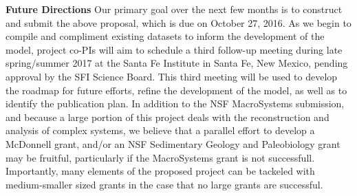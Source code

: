 \documentclass{article}[10pt]
\begin{document}
\vspace{5 mm}

{\bf Future Directions} Our primary goal over the next few months is to construct and submit the above proposal, which is due on October 27, 2016.
As we begin to compile and compliment existing datasets to inform the development of the model, project co-PIs will aim to schedule a third follow-up meeting during late spring/summer 2017 at the Santa Fe Institute in Santa Fe, New Mexico, pending approval by the SFI Science Board.
This third meeting will be used to develop the roadmap for future efforts, refine the development of the model, as well as to identify the publication plan.
In addition to the NSF MacroSystems submission, and because a large portion of this project deals with the reconstruction and analysis of complex systems, we believe that a parallel effort to develop a McDonnell grant, and/or an NSF Sedimentary Geology and Paleobiology grant may be fruitful, particularly if the MacroSystems grant is not successfull.
Importantly, many elements of the proposed project can be tackeled with medium-smaller sized grants in the case that no large grants are successful.
\end{document}
